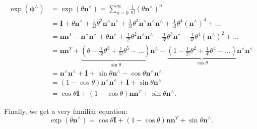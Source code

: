 \begin{align*}
\exp \left( {{\boldsymbol{\phi} ^ \wedge }} \right) &= \exp \left( {\theta {\mathbf{n}^ \wedge }} \right) = \sum\limits_ {n = 0}^\infty {\frac{1}{{n!}}{{\left( {\theta {\mathbf{n}^ \wedge }} \right)}^n}} \\
&= \mathbf{I} + \theta {\mathbf{n}^ \wedge } + \frac{1}{{2!}}{\theta ^2}{\mathbf{n}^ \wedge }{\mathbf{n}^ \wedge } + \frac{1}{{3!}}{\theta ^3}{\mathbf{n}^ \wedge }{\mathbf{n}^ \wedge }{\mathbf{n}^ \wedge } + \frac{1}{{4!}}{\theta ^4}{\left( {{\mathbf{n}^ \wedge }} \right)^4} + ... \\
&= \mathbf{n} {\mathbf{n}^T} - {\mathbf{n}^ \wedge }{\mathbf{n}^ \wedge } + \theta {\mathbf{n} ^ \wedge } + \frac{1}{{2!}}\theta^2 {\mathbf{n}^ \wedge }{\mathbf{n}^ \wedge } - \frac{1}{{3! }}{\theta ^3}{\mathbf{n}^ \wedge } - \frac{1}{{4!}}{\theta ^4}{\left( {{\mathbf{n}^ \wedge }} \right)^2} + ...\\
&= \mathbf{n}{\mathbf{n}^T} + \underbrace{\left( {\theta - \frac{1}{{3!}}{\theta ^3} + \frac{1}{{5!}}{\theta ^5} - ...} \right)}_{\sin \theta} {\mathbf{n}^ \wedge } - \underbrace{\left( { 1 - \frac{1}{{2!}}{\theta ^2} + \frac{1}{{4!}}{\theta ^4} - ...} \right)}_{\cos \theta}{\mathbf{n}^ \wedge }{\mathbf{n}^ \wedge }\\
&= {\mathbf{n}^ \wedge }{\mathbf{n}^ \wedge } + \mathbf{I} + \sin \theta {\mathbf{n}^ \wedge } - \cos \theta {\mathbf{n}^ \wedge }{\mathbf{n}^ \wedge }\\
&= (1 - \cos \theta ){\mathbf{n}^ \wedge }{\mathbf{n}^ \wedge } + \mathbf{I} + \sin \theta {\mathbf{n}^ \wedge }\\
&= \cos \theta \mathbf{I} + (1 - \cos \theta )\mathbf{n}{\mathbf{n}^T} + \sin \theta {\mathbf{n}^ \wedge }.
\end{align*}

Finally, we get a very familiar equation:
\begin{equation}
\exp( \theta \mathbf{n}^\wedge ) = \cos \theta \mathbf{I} + (1 - \cos \theta )\mathbf{n}{\mathbf{n}^T } + \sin \theta {\mathbf{n}^ \wedge }.
\end{equation}


